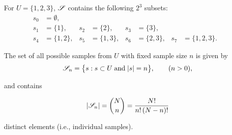 \documentclass{my_eth_beamer}
\numberwithin{equation}{section}
\begin{document}
\begin{frame}
    \begin{Bsp}[U3]\label{ex:basics_u3}
        \vspace{-0.5em}
        For $U = \{1, 2, 3\}$, $\mathscr{S}$ contains the following $2^3$
        subsets:
        \vspace{-0.5em}
        \begin{align*}
            s_0 &= \emptyset,\\
            s_1 &= \{1\}, & s_2 &= \{2\}, &s_3 &= \{3\},\\
            s_4 &= \{1, 2\},& s_5 &= \{1, 3\}, &s_6 &= \{2, 3\},
                &s_7 &= \{1, 2, 3\}.&
        \end{align*}
    \end{Bsp}
    The set of all possible samples from $U$ with \alert{fixed sample size}
    $n$ is given by
            \begin{equation*}
                \mathscr{S}_n = \big\{s : s \subset U \; \text{and}
                \; \vert s \vert = n\big\}, \qquad (n > 0),
            \end{equation*}

    \vspace{-0.5em}

    and contains

    \vspace{-1.5em}

    \begin{equation*}
        \vert \mathscr{S}_n \vert = \binom{N}{n} =
            \frac{N!}{n! \, (N - n)!}
    \end{equation*}

    \vspace{0.25em}

    \noindent distinct elements (i.e., individual samples).
\end{frame}
\end{document}
